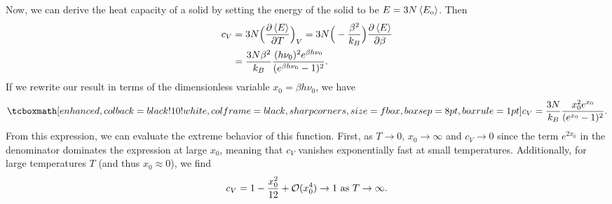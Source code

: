 {Now, we can derive the heat capacity of a solid by setting the energy of the solid to be $E = 3 N \expval{E_{\rm o}}$.
Then
\begin{eqnarray}
    \begin{aligned}
        c_{V} &= 3N \Big( \pdv{\expval{E}}{T} \Big)_{V} = 3N \Big( -\frac{\beta^2}{k_{B}} \Big) \pdv{\expval{E}}{\beta} \\
              &= \frac{3 N \beta^2}{k_{B}} \frac{(h \nu_0)^2 e^{\beta h \nu_0}}{(e^{\beta h \nu_0} - 1)^2}
    .\end{aligned}
\end{eqnarray}
If we rewrite our result in terms of the dimensionless variable $x_0 = \beta h \nu_0$, we have
\begin{eqnarray}
    \eqbox{ c_{V} = \frac{3N}{k_{B}} \frac{x_0^2 e^{x_0}}{(e^{x_0} - 1)^2} }
.\end{eqnarray}
From this expression, we can evaluate the extreme behavior of this function.
First, as $T \rightarrow 0$, $x_0 \rightarrow \infty$ and $c_{V} \rightarrow 0$ since the term $e^{2x_0}$ in the denominator dominates the expression at large $x_0$, meaning that $c_{V}$ vanishes exponentially fast at small temperatures.
Additionally, for large temperatures $T$ (and thus $x_0 \approx 0$), we find
\begin{eqnarray}
    c_{V} = 1 - \frac{x_0^2}{12} + {\cal O}(x_0^{4}) \rightarrow 1 ~{\rm as}~ T \rightarrow \infty
.\end{eqnarray}

}
